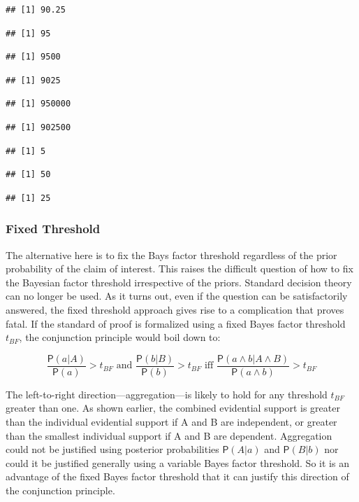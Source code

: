 \documentclass[10pt,dvipsnames,enabledeprecatedfontcommands]{scrartcl}
\newcommand{\et}{\wedge}
\newcommand{\pr}[1]{\mathsf{P}(#1)}
\begin{document}
\begin{verbatim}
## [1] 90.25
\end{verbatim}

\begin{verbatim}
## [1] 95
\end{verbatim}

\begin{verbatim}
## [1] 9500
\end{verbatim}

\begin{verbatim}
## [1] 9025
\end{verbatim}

\begin{verbatim}
## [1] 950000
\end{verbatim}

\begin{verbatim}
## [1] 902500
\end{verbatim}

\begin{verbatim}
## [1] 5
\end{verbatim}

\begin{verbatim}
## [1] 50
\end{verbatim}

\begin{verbatim}
## [1] 25
\end{verbatim}

\hypertarget{fixed-threshold}{%
\subsubsection{Fixed Threshold}\label{fixed-threshold}}

The alternative here is to fix the Bays factor threshold regardless of
the prior probability of the claim of interest. This raises the
difficult question of how to fix the Bayesian factor threshold
irrespective of the priors. Standard decision theory can no longer be
used. As it turns out, even if the question can be satisfactorily
answered, the fixed threshold approach gives rise to a complication that
proves fatal. If the standard of proof is formalized using a fixed Bayes
factor threshold \(t_{BF}\), the conjunction principle would boil down
to:

\[  \text{ $\frac{\pr{a | A }}{\pr{a}}>t_{BF}$ and $\frac{\pr{ b | B}}{\pr{b}}>t_{BF}$ iff $\frac{\pr{a \et b | A \et B}}{\pr{a \et b}}>t_{BF}$ } \]

\noindent The left-to-right direction---aggregation---is likely to hold
for any threshold \(t_{BF}\) greater than one. As shown earlier, the
combined evidential support is greater than the individual evidential
support if A and B are independent, or greater than the smallest
individual support if A and B are dependent. Aggregation could not be
justified using posterior probabilities \(\pr{A | a}\) and
\(\pr{B | b}\) nor could it be justified generally using a variable
Bayes factor threshold. So it is an advantage of the fixed Bayes factor
threshold that it can justify this direction of the conjunction
principle.
\end{document}
